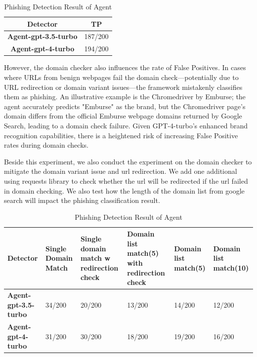 \begin{table}[h!]
    \centering
    \begin{tabular}{cc}
     \textbf{Detector} & \textbf{TP}  \\
     \midrule
      \textbf{Agent-gpt-3.5-turbo}   & 187/200 \\
      \textbf{Agent-gpt-4-turbo}   & 194/200  \\
    \end{tabular}
    \caption{Phishing Detection Result of Agent}
    \label{tab:my_label}
\end{table}

However, the domain checker also influences the rate of False Positives. In cases where URLs from benign webpages fail the domain check—potentially due to URL redirection or domain variant issues—the framework mistakenly classifies them as phishing. An illustrative example is the Chromedriver by Emburse; the agent accurately predicts "Emburse" as the brand, but the Chromedriver page's domain differs from the official Emburse webpage domains returned by Google Search, leading to a domain check failure. Given GPT-4-turbo's enhanced brand recognition capabilities, there is a heightened risk of increasing False Positive rates during domain checks. 

Beside this experiment, we also conduct the experiment on the domain checker to mitigate the domain variant issue and url redirection. We add one additional using requests library to check whether the url will be redirected if the url failed in domain checking. We also test how the length of the domain list from google search will impact the phishing classification result.

\begin{table}[h!]
    \centering
    \begin{tabular}{p{2.1cm}p{2.1cm}p{2.1cm}p{2.1cm}p{2.1cm}p{2.1cm}}
     \textbf{Detector} & \textbf{Single Domain Match} &\textbf{Single domain match w redirection check} & \textbf{Domain list match(5) with redirection check} & \textbf{Domain list match(5)} & \textbf{Domain list match(10)}\\
     \midrule
      \textbf{Agent-gpt-3.5-turbo}   & 34/200 & 20/200 & 13/200 & 14/200 & 12/200  \\
      \textbf{Agent-gpt-4-turbo}   & 31/200 & 30/200 & 18/200 & 19/200 & 16/200  \\
    \end{tabular}
    \caption{Phishing Detection Result of Agent}
    \label{tab:my_label}
\end{table}

